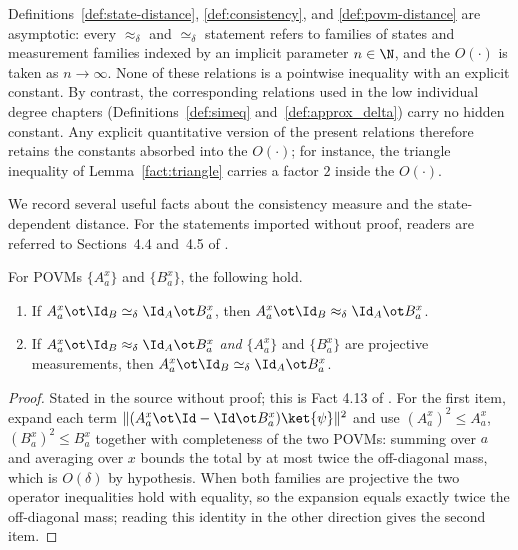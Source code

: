 \begin{remark}\label{rem:asymptotic-distance}
	Definitions~\ref{def:state-distance}, \ref{def:consistency}, and \ref{def:povm-distance} are asymptotic: every $\approx_\delta$ and $\simeq_\delta$ statement refers to families of states and measurement families indexed by an implicit parameter $n \in \N$, and the $O(\cdot)$ is taken as $n \to \infty$. None of these relations is a pointwise inequality with an explicit constant. By contrast, the corresponding relations used in the low individual degree chapters (Definitions~\ref{def:simeq} and~\ref{def:approx_delta}) carry no hidden constant. Any explicit quantitative version of the present relations therefore retains the constants absorbed into the $O(\cdot)$; for instance, the triangle inequality of Lemma~\ref{fact:triangle} carries a factor $2$ inside the $O(\cdot)$.
\end{remark}

We record several useful facts about the consistency measure and the state-dependent distance. For the statements imported without proof, readers are referred to Sections~4.4 and~4.5 of \cite{Natarajan2018NEEXP}.

\begin{lemma}\label{fact:agreement}
	\leanok
	For POVMs $\{A^x_a\}$ and $\{B^x_a\}$, the following hold.
	\begin{enumerate}
		\item If $A^x_a \ot \Id_B \simeq_\delta \Id_A \ot B^x_a$, then $A^x_a \ot \Id_B \approx_\delta \Id_A \ot B^x_a$.
		\item If $A^x_a \ot \Id_B \approx_\delta \Id_A \ot B^x_a$ \emph{and} $\{A^x_a\}$ and $\{B^x_a\}$ are projective measurements, then $A^x_a \ot \Id_B \simeq_\delta \Id_A \ot B^x_a$.
	\end{enumerate}
\end{lemma}
\begin{proof}
	\leanok
	Stated in the source without proof; this is Fact 4.13 of \cite{Natarajan2018NEEXP}. For the first item, expand each term $\lVert (A^x_a \ot \Id - \Id \ot B^x_a)\ket{\psi} \rVert^2$ and use $ (A^x_a)^2 \le A^x_a$, $(B^x_a)^2 \le B^x_a$ together with completeness of the two POVMs: summing over $a$ and averaging over $x$ bounds the total by at most twice the off-diagonal mass, which is $O(\delta)$ by hypothesis. When both families are projective the two operator inequalities hold with equality, so the expansion equals exactly twice the off-diagonal mass; reading this identity in the other direction gives the second item.
\end{proof}

